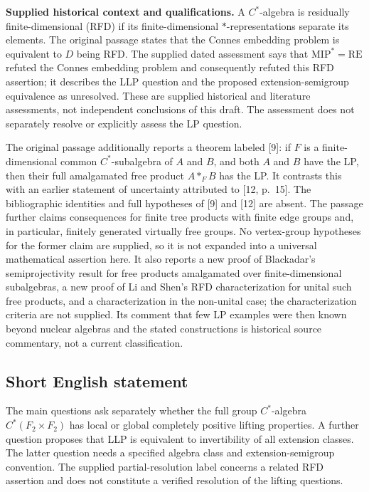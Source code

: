 \documentclass[11pt]{article}
\begin{document}
\textbf{Supplied historical context and qualifications.} A \(C^*\)-algebra is residually finite-dimensional (RFD) if its finite-dimensional \(*\)-representations separate its elements. The original passage states that the Connes embedding problem is equivalent to \(D\) being RFD. The supplied dated assessment says that \(\mathrm{MIP}^*=\mathrm{RE}\) refuted the Connes embedding problem and consequently refuted this RFD assertion; it describes the LLP question and the proposed extension-semigroup equivalence as unresolved. These are supplied historical and literature assessments, not independent conclusions of this draft. The assessment does not separately resolve or explicitly assess the LP question.

The original passage additionally reports a theorem labeled [9]: if \(F\) is a finite-dimensional common \(C^*\)-subalgebra of \(A\) and \(B\), and both \(A\) and \(B\) have the LP, then their full amalgamated free product \(A*_F B\) has the LP. It contrasts this with an earlier statement of uncertainty attributed to [12, p.~15]. The bibliographic identities and full hypotheses of [9] and [12] are absent. The passage further claims consequences for finite tree products with finite edge groups and, in particular, finitely generated virtually free groups. No vertex-group hypotheses for the former claim are supplied, so it is not expanded into a universal mathematical assertion here. It also reports a new proof of Blackadar's semiprojectivity result for free products amalgamated over finite-dimensional subalgebras, a new proof of Li and Shen's RFD characterization for unital such free products, and a characterization in the non-unital case; the characterization criteria are not supplied. Its comment that few LP examples were then known beyond nuclear algebras and the stated constructions is historical source commentary, not a current classification.
\subsection{Short English statement}
The main questions ask separately whether the full group \(C^*\)-algebra \(C^*(F_2\times F_2)\) has local or global completely positive lifting properties. A further question proposes that LLP is equivalent to invertibility of all extension classes. The latter question needs a specified algebra class and extension-semigroup convention. The supplied partial-resolution label concerns a related RFD assertion and does not constitute a verified resolution of the lifting questions.
\end{document}

